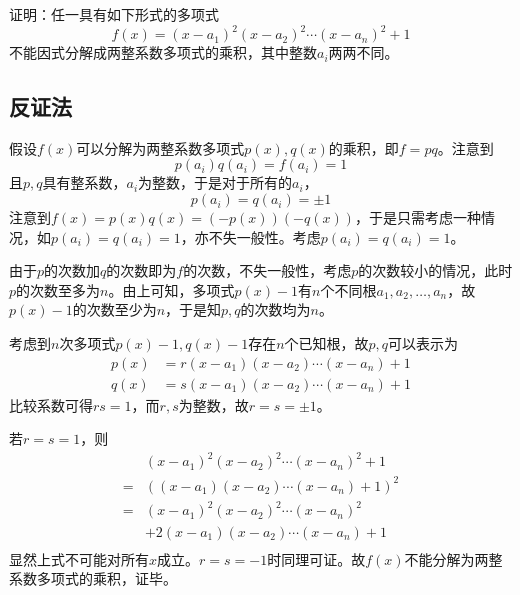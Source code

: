 

证明：任一具有如下形式的多项式
\[ f(x) = (x - a_1)^2(x - a_2)^2\cdots(x - a_n)^2 + 1 \]
不能因式分解成两整系数多项式的乘积，其中整数$a_i$两两不同。

\subsection{反证法}

假设$f(x)$可以分解为两整系数多项式$p(x), q(x)$的乘积，即$f = pq$。注意到
\[ p(a_i)q(a_i) = f(a_i) = 1 \]
且$p, q$具有整系数，$a_i$为整数，于是对于所有的$a_i$，
\[ p(a_i) = q(a_i) = \pm1 \]
注意到$f(x) = p(x)q(x) = (-p(x))(-q(x))$，于是只需考虑一种情况，如$p(a_i) = q(a_i) = 1$，亦不失一般性。考虑$p(a_i) = q(a_i) = 1$。

由于$p$的次数加$q$的次数即为$f$的次数，不失一般性，考虑$p$的次数较小的情况，此时$p$的次数至多为$n$。由上可知，多项式$p(x) - 1$有$n$个不同根$a_1, a_2, \dots, a_n$，故$p(x) - 1$的次数至少为$n$，于是知$p, q$的次数均为$n$。

考虑到$n$次多项式$p(x) - 1, q(x) - 1$存在$n$个已知根，故$p, q$可以表示为
\begin{align*}
  p(x) &= r(x - a_1)(x - a_2)\cdots(x - a_n) + 1 \\
  q(x) &= s(x - a_1)(x - a_2)\cdots(x - a_n) + 1
\end{align*}
比较系数可得$rs = 1$，而$r, s$为整数，故$r = s = \pm1$。

若$r = s = 1$，则
\begin{align*}
  & (x - a_1)^2(x - a_2)^2\cdots(x - a_n)^2 + 1 \\
  ={}& ((x - a_1)(x - a_2)\cdots(x - a_n) + 1)^2 \\
  ={}& (x - a_1)^2(x - a_2)^2\cdots(x - a_n)^2 \\
  &+ 2(x - a_1)(x - a_2)\cdots(x - a_n) + 1 \\
\end{align*}
显然上式不可能对所有$x$成立。$r = s = -1$时同理可证。故$f(x)$不能分解为两整系数多项式的乘积，证毕。
